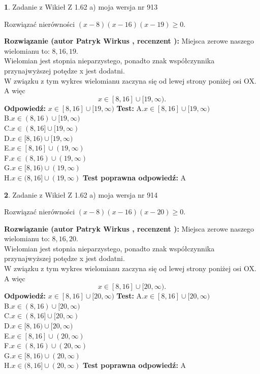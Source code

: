 \documentclass[12pt, a4paper]{article}
\theoremstyle{definition} %
\newtheorem{zad}{}
\newcommand{\zadStart}[1]{\begin{zad}#1\newline}
\newcommand{\zadStop}{\end{zad}}
\newcommand{\rozwStart}[2]{\noindent \textbf{Rozwiązanie (autor #1 , recenzent #2): }\newline}
\newcommand{\rozwStop}{\newline}
\newcommand{\odpStart}{\noindent \textbf{Odpowiedź:}\newline}
\newcommand{\odpStop}{\newline}
\newcommand{\testStart}{\noindent \textbf{Test:}\newline}
\newcommand{\testStop}{\newline}
\newcommand{\kluczStart}{\noindent \textbf{Test poprawna odpowiedź:}\newline}
\newcommand{\kluczStop}{\newline}
\begin{document}
\zadStart{Zadanie z Wikieł Z 1.62 a) moja wersja nr 913}

Rozwiązać nierówności $(x-8)(x-16)(x-19)\ge0$.
\zadStop
\rozwStart{Patryk Wirkus}{}
Miejsca zerowe naszego wielomianu to: $8, 16, 19$.\\
Wielomian jest stopnia nieparzystego, ponadto znak współczynnika przy\linebreak najwyższej potędze x jest dodatni.\\ W związku z tym wykres wielomianu zaczyna się od lewej strony poniżej osi OX. A więc $$x \in [8,16] \cup [19,\infty).$$
\rozwStop
\odpStart
$x \in [8,16] \cup [19,\infty)$
\odpStop
\testStart
A.$x \in [8,16] \cup [19,\infty)$\\
B.$x \in (8,16) \cup [19,\infty)$\\
C.$x \in (8,16] \cup [19,\infty)$\\
D.$x \in [8,16) \cup [19,\infty)$\\
E.$x \in [8,16] \cup (19,\infty)$\\
F.$x \in (8,16) \cup (19,\infty)$\\
G.$x \in [8,16) \cup (19,\infty)$\\
H.$x \in (8,16] \cup (19,\infty)$
\testStop
\kluczStart
A
\kluczStop



\zadStart{Zadanie z Wikieł Z 1.62 a) moja wersja nr 914}

Rozwiązać nierówności $(x-8)(x-16)(x-20)\ge0$.
\zadStop
\rozwStart{Patryk Wirkus}{}
Miejsca zerowe naszego wielomianu to: $8, 16, 20$.\\
Wielomian jest stopnia nieparzystego, ponadto znak współczynnika przy\linebreak najwyższej potędze x jest dodatni.\\ W związku z tym wykres wielomianu zaczyna się od lewej strony poniżej osi OX. A więc $$x \in [8,16] \cup [20,\infty).$$
\rozwStop
\odpStart
$x \in [8,16] \cup [20,\infty)$
\odpStop
\testStart
A.$x \in [8,16] \cup [20,\infty)$\\
B.$x \in (8,16) \cup [20,\infty)$\\
C.$x \in (8,16] \cup [20,\infty)$\\
D.$x \in [8,16) \cup [20,\infty)$\\
E.$x \in [8,16] \cup (20,\infty)$\\
F.$x \in (8,16) \cup (20,\infty)$\\
G.$x \in [8,16) \cup (20,\infty)$\\
H.$x \in (8,16] \cup (20,\infty)$
\testStop
\kluczStart
A
\kluczStop
\end{document}
